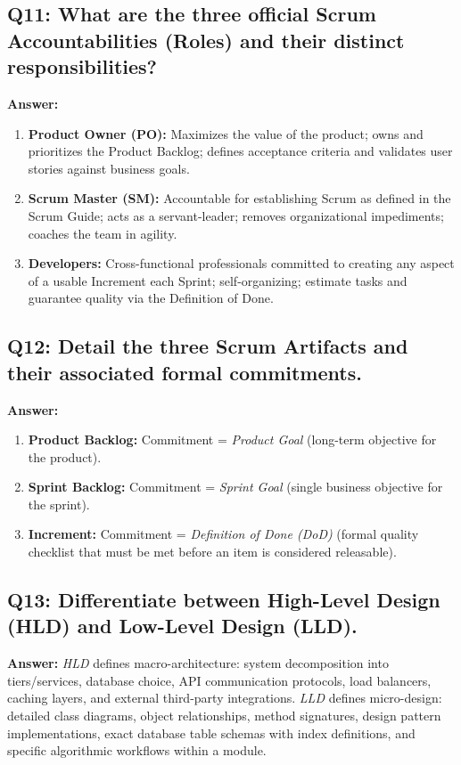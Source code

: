 \subsection*{Q11: What are the three official Scrum Accountabilities (Roles) and their distinct responsibilities?}
\textbf{Answer:}
\begin{enumerate}[label=\arabic*.]
    \item \textbf{Product Owner (PO):} Maximizes the value of the product; owns and prioritizes the Product Backlog; defines acceptance criteria and validates user stories against business goals.
    \item \textbf{Scrum Master (SM):} Accountable for establishing Scrum as defined in the Scrum Guide; acts as a servant-leader; removes organizational impediments; coaches the team in agility.
    \item \textbf{Developers:} Cross-functional professionals committed to creating any aspect of a usable Increment each Sprint; self-organizing; estimate tasks and guarantee quality via the Definition of Done.
\end{enumerate}

\subsection*{Q12: Detail the three Scrum Artifacts and their associated formal commitments.}
\textbf{Answer:}
\begin{enumerate}[label=\arabic*.]
    \item \textbf{Product Backlog:} Commitment = \textit{Product Goal} (long-term objective for the product).
    \item \textbf{Sprint Backlog:} Commitment = \textit{Sprint Goal} (single business objective for the sprint).
    \item \textbf{Increment:} Commitment = \textit{Definition of Done (DoD)} (formal quality checklist that must be met before an item is considered releasable).
\end{enumerate}

\subsection*{Q13: Differentiate between High-Level Design (HLD) and Low-Level Design (LLD).}
\textbf{Answer:} \textit{HLD} defines macro-architecture: system decomposition into tiers/services, database choice, API communication protocols, load balancers, caching layers, and external third-party integrations. \textit{LLD} defines micro-design: detailed class diagrams, object relationships, method signatures, design pattern implementations, exact database table schemas with index definitions, and specific algorithmic workflows within a module.

